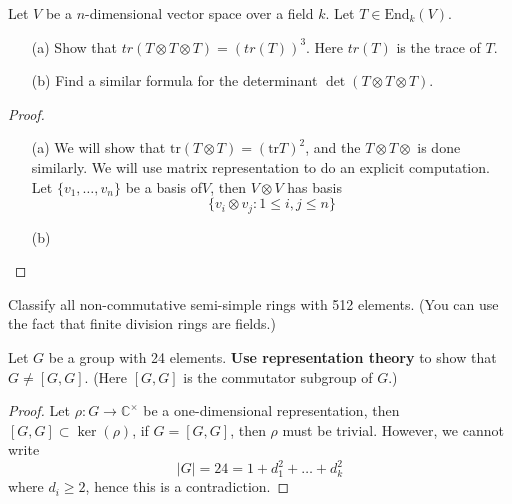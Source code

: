 \documentclass[openany]{book}
\newcommand{\tr}{\text{tr}}
\newcommand{\C}{\mathbb{C}}
\begin{document}
\begin{prob}
    Let \(V\) be a \(n\)-dimensional vector space over a field \(k\). Let \(T \in \text{End}_k(V)\).
    \begin{itemize}
        \item[(a)] Show that \(tr(T \otimes T \otimes T) = (tr(T))^3\). Here \(tr(T)\) is the trace of \(T\).
        \item[(b)] Find a similar formula for the determinant \(\det(T \otimes T \otimes T)\).
    \end{itemize}
\end{prob}
\begin{proof}
    \begin{itemize}
        \item[(a)] We will show that $\tr(T\otimes T)=(\tr T)^2$, and the $T\otimes T\otimes$ is done similarly. We will use matrix representation to do an explicit computation. Let $\{v_1,\dots, v_n\}$ be a basis of$V$, then $V\otimes V$ has basis 
        \begin{equation*}
            \{v_i\otimes v_j: 1\leq i,j\leq n\}
        \end{equation*}

        \item[(b)]  
    \end{itemize}
\end{proof}


\begin{prob}
    Classify all non-commutative semi-simple rings with 512 elements. (You can use the fact that finite division rings are fields.)
\end{prob}



\begin{prob}
    Let \(G\) be a group with 24 elements. \textbf{Use representation theory} to show that \(G \neq [G, G]\). (Here \([G, G]\) is the commutator subgroup of \(G\).)
\end{prob}
\begin{proof}
    Let $\rho:G\to\C^\times$ be a one-dimensional representation, then $[G,G]\subset\ker(\rho)$, if $G=[G,G]$, then $\rho$ must be trivial. However, we cannot write 
    \begin{equation*}
        |G|=24=1+d_1^2+\dots+d_k^2
    \end{equation*}
    where $d_i\geq 2$, hence this is a contradiction.
\end{proof}
\end{document}
